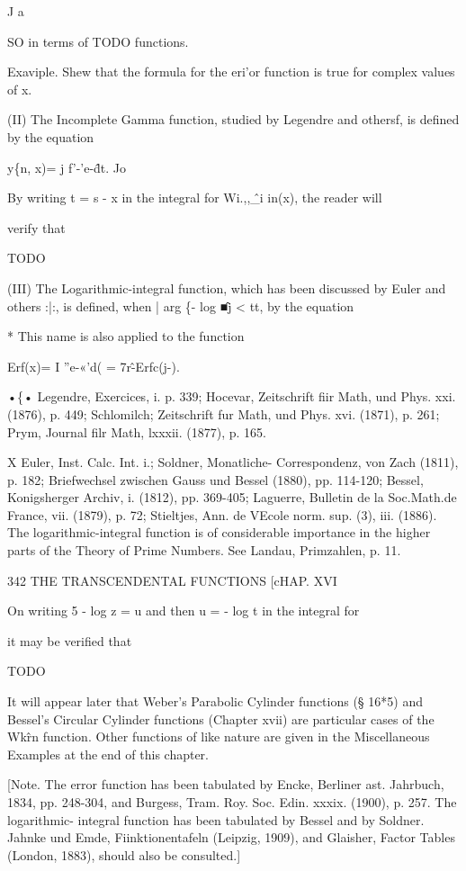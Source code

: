 J a

SO in terms of TODO functions.

Exaviple. Shew that the formula for the eri'or function is true for
complex values of x.

(II) The Incomplete Gamma function, studied by Legendre and othersf,
is defined by the equation

y\{n, x)= j f'-'e-\^dt. Jo

By writing t = s - x in the integral for Wi.,,\^\_i in(x), the reader
will

verify that

TODO

(III) The Logarithmic-integral function, which has been discussed by
Euler and others :|:, is defined, when | arg \{- log \^■j < tt, by the
equation

* This name is also applied to the function

Erf(x)= I ''e-«'d( = 7r\^-Erfc(j-).

•\{• Legendre, Exercices, i. p. 339; Hocevar, Zeitschrift fiir Math,
und Phys. xxi. (1876), p. 449; Schlomilch; Zeitschrift fur Math, und
Phys. xvi. (1871), p. 261; Prym, Journal filr Math, lxxxii. (1877),
p. 165.

X Euler, Inst. Calc. Int. i.; Soldner, Monatliche- Correspondenz, von
Zach (1811), p. 182; Briefwechsel zwischen Gauss und Bessel (1880),
pp. 114-120; Bessel, Konigsherger Archiv, i. (1812), pp. 369-405;
Laguerre, Bulletin de la Soc.Math.de France, vii. (1879), p. 72;
Stieltjes, Ann. de VEcole norm. sup. (3), iii. (1886). The
logarithmic-integral function is of considerable importance in the
higher parts of the Theory of Prime Numbers. See Landau, Primzahlen,
p. 11.

342 THE TRANSCENDENTAL FUNCTIONS [cHAP. XVI

On writing 5 - log z = u and then u = - log t in the integral for

it may be verified that

TODO

It will appear later that Weber's Parabolic Cylinder functions (§
16*5) and Bessel's Circular Cylinder functions (Chapter xvii) are
particular cases of the Wk\^rn function. Other functions of like
nature are given in the Miscellaneous Examples at the end of this
chapter.

[Note. The error function has been tabulated by Encke, Berliner ast.
Jahrbuch, 1834, pp. 248-304, and Burgess, Tram. Roy. Soc. Edin. xxxix.
(1900), p. 257. The logarithmic- integral function has been tabulated
by Bessel and by Soldner. Jahnke und Emde, Fiinktionentafeln (Leipzig,
1909), and Glaisher, Factor Tables (London, 1883), should also be
consulted.]

